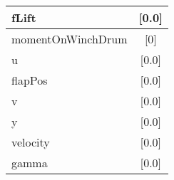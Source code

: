 \begin{center}
\begin{tabular}{|l|c|}
fLift & [0.0] \\ \hline 

momentOnWinchDrum & [0] \\ \hline 

u & [0.0] \\ \hline 

flapPos & [0.0] \\ \hline 

v & [0.0] \\ \hline 

y & [0.0] \\ \hline 

velocity & [0.0] \\ \hline 

gamma & [0.0] \\ \hline 

            \end{tabular}

        \end{center}

